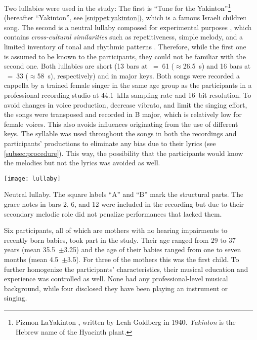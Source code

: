 Two lullabies were used in the study: The first is \enquote{Tune for the Yakinton}\footnote{Pizmon LaYakinton
, written by Leah Goldberg in 1940. \emph{Yakinton} is the Hebrew name of the Hyacinth plant.} (hereafter \enquote{Yakinton}, see \cref{snippet:yakinton}), which is a famous Israeli children song.
The second is a neutral lullaby composed for experimental purposes \citep[][pp.~22-47, and see \cref{snippet:uni-lullaby}]{Twig2016universal}, which contains \emph{cross-cultural similarities} such as repetitiveness, simple melody, and a limited inventory of tonal and rhythmic patterns \citep{Unyk1992lullabies, Trehub1993maternal}.
Therefore, while the first one is assumed to be known to the participants, they could not be familiar with the second one.
Both lullabies are short (13 bars at \musQuarter~=~61 ($\approx$\SI{26.5}{\second}) and 16 bars at \musQuarterDotted~=~33 ($\approx$\SI{58}{\second}), respectively) and in major keys.
Both songs were recorded a cappella by a trained female singer in the same age group as the participants in a professional recording studio at \SI{44.1}{\kilo\hertz} sampling rate and 16~bit resolution.
To avoid changes in voice production, decrease vibrato, and limit the singing effort, the songs were transposed and recorded in B major, which is relatively low for female voices.
This also avoids influences originating from the use of different keys.
The syllable \textipa{[na]} was used throughout the songs in both the recordings and participants' productions to eliminate any bias due to their lyrics (see \cref{subsec:procedure}).
This way, the possibility that the participants would know the melodies but not the lyrics was avoided as well.

\begin{snippet}[t]
	\centering
	\texttt{[image: lullaby]}
	\caption{Neutral lullaby.
			 The square labels \enquote{A} and \enquote{B} mark the structural parts.
		 	 The grace notes in bars 2, 6, and 12 were included in the recording but due to their secondary melodic role did not penalize performances that lacked them.}
	\label{snippet:uni-lullaby}
\end{snippet}

Six participants, all of which are mothers with no hearing impairments to recently born babies, took part in the study.
Their age ranged from 29 to 37 years (mean 35.5~$\pm$3.25) and the age of their babies ranged from one to seven months (mean 4.5~$\pm$3.5).
For three of the mothers this was the first child.
To further homogenize the participants' characteristics, their musical education and experience was controlled as well.
None had any professional-level musical background, while four disclosed they have been playing an instrument or singing.

